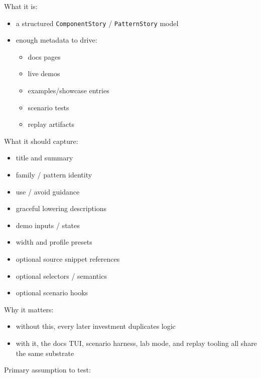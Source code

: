 What it is:

\begin{itemize}
\tightlist
\item
  a structured \texttt{C\allowbreak{}o\allowbreak{}m\allowbreak{}p\allowbreak{}o\allowbreak{}n\allowbreak{}e\allowbreak{}n\allowbreak{}t\allowbreak{}S\allowbreak{}t\allowbreak{}o\allowbreak{}r\allowbreak{}y} / \texttt{P\allowbreak{}a\allowbreak{}t\allowbreak{}t\allowbreak{}e\allowbreak{}r\allowbreak{}n\allowbreak{}S\allowbreak{}t\allowbreak{}o\allowbreak{}r\allowbreak{}y} model
\item
  enough metadata to drive:

  \begin{itemize}
  \tightlist
  \item
    docs pages
  \item
    live demos
  \item
    examples/showcase entries
  \item
    scenario tests
  \item
    replay artifacts
  \end{itemize}
\end{itemize}

What it should capture:

\begin{itemize}
\tightlist
\item
  title and summary
\item
  family / pattern identity
\item
  use / avoid guidance
\item
  graceful lowering descriptions
\item
  demo inputs / states
\item
  width and profile presets
\item
  optional source snippet references
\item
  optional selectors / semantics
\item
  optional scenario hooks
\end{itemize}

Why it matters:

\begin{itemize}
\tightlist
\item
  without this, every later investment duplicates logic
\item
  with it, the docs TUI, scenario harness, lab mode, and replay tooling all share the same substrate
\end{itemize}

Primary assumption to test:

